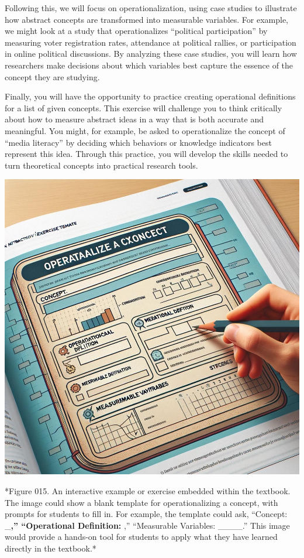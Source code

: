 \documentclass[
]{book}
\begin{document}
Following this, we will focus on operationalization, using case studies to illustrate how abstract concepts are transformed into measurable variables. For example, we might look at a study that operationalizes ``political participation'' by measuring voter registration rates, attendance at political rallies, or participation in online political discussions. By analyzing these case studies, you will learn how researchers make decisions about which variables best capture the essence of the concept they are studying.

Finally, you will have the opportunity to practice creating operational definitions for a list of given concepts. This exercise will challenge you to think critically about how to measure abstract ideas in a way that is both accurate and meaningful. You might, for example, be asked to operationalize the concept of ``media literacy'' by deciding which behaviors or knowledge indicators best represent this idea. Through this practice, you will develop the skills needed to turn theoretical concepts into practical research tools.

\includegraphics[width=1\textwidth,height=\textheight]{images/fig015.jpg}

*Figure 015. An interactive example or exercise embedded within the textbook. The image could show a blank template for operationalizing a concept, with prompts for students to fill in. For example, the template could ask, ``Concept: \_\textbf{,'' ``Operational Definition: },'' ``Measurable Variables: \_\_\_\_.'' This image would provide a hands-on tool for students to apply what they have learned directly in the textbook.*
\end{document}
